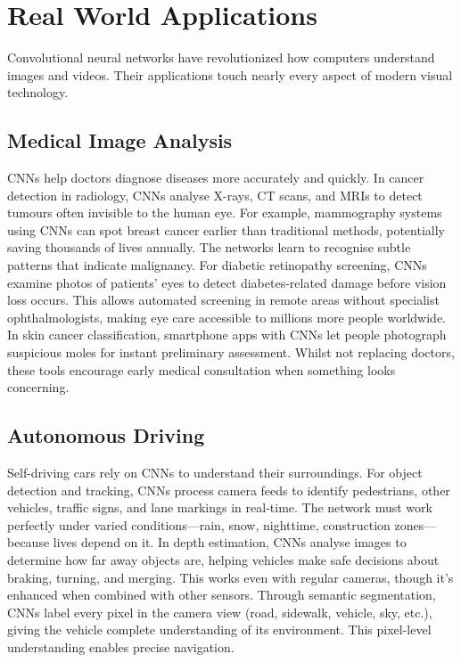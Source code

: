 
\section{Real World Applications}
\label{sec:cnn-real-world}


Convolutional neural networks have revolutionized how computers understand images and videos. Their applications touch nearly every aspect of modern visual technology.

\subsection{Medical Image Analysis}

CNNs help doctors diagnose diseases more accurately and quickly. In cancer detection in radiology, CNNs analyse X-rays, CT scans, and MRIs to detect tumours often invisible to the human eye. For example, mammography systems using CNNs can spot breast cancer earlier than traditional methods, potentially saving thousands of lives annually. The networks learn to recognise subtle patterns that indicate malignancy. For diabetic retinopathy screening, CNNs examine photos of patients' eyes to detect diabetes-related damage before vision loss occurs. This allows automated screening in remote areas without specialist ophthalmologists, making eye care accessible to millions more people worldwide. In skin cancer classification, smartphone apps with CNNs let people photograph suspicious moles for instant preliminary assessment. Whilst not replacing doctors, these tools encourage early medical consultation when something looks concerning.

\subsection{Autonomous Driving}

Self-driving cars rely on CNNs to understand their surroundings. For object detection and tracking, CNNs process camera feeds to identify pedestrians, other vehicles, traffic signs, and lane markings in real-time. The network must work perfectly under varied conditions—rain, snow, nighttime, construction zones—because lives depend on it. In depth estimation, CNNs analyse images to determine how far away objects are, helping vehicles make safe decisions about braking, turning, and merging. This works even with regular cameras, though it's enhanced when combined with other sensors. Through semantic segmentation, CNNs label every pixel in the camera view (road, sidewalk, vehicle, sky, etc.), giving the vehicle complete understanding of its environment. This pixel-level understanding enables precise navigation.

